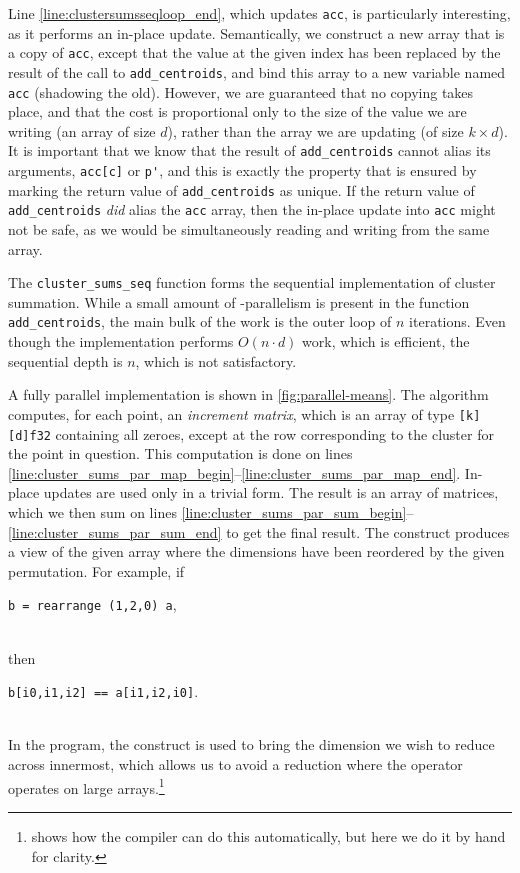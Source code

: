 Line \ref{line:clustersumsseqloop_end}, which updates \texttt{acc}, is
particularly interesting, as it performs an in-place update.
Semantically, we construct a new array that is a copy of \texttt{acc},
except that the value at the given index has been replaced by the
result of the call to \texttt{add\_centroids}, and bind this array to
a new variable named \texttt{acc} (shadowing the old).  However, we
are guaranteed that no copying takes place, and that the cost is
proportional only to the size of the value we are writing (an array of
size $d$), rather than the array we are updating (of size
$k\times{}d$).  It is important that we know that the result of
\lstinline{add_centroids} cannot alias its arguments,
\lstinline{acc[c]} or \lstinline{p'}, and this is exactly the property
that is ensured by marking the return value of
\lstinline{add_centroids} as unique.  If the return value of
\lstinline{add_centroids} \textit{did} alias the \lstinline{acc}
array, then the in-place update into \lstinline{acc} might not be
safe, as we would be simultaneously reading and writing from the same
array.

The \lstinline{cluster_sums_seq} function forms the sequential
implementation of cluster summation.  While a small amount of
-parallelism is present in the function
\lstinline{add_centroids}, the main bulk of the work is the outer loop
of $n$ iterations.  Even though the implementation performs
$O(n\cdot{}d)$ work, which is efficient, the sequential depth is $n$,
which is not satisfactory.

A fully parallel implementation is shown in \cref{fig:parallel-means}.
The algorithm computes, for each point, an \textit{increment matrix},
which is an array of type \lstinline{[k][d]f32} containing all zeroes,
except at the row corresponding to the cluster for the point in
question.  This computation is done on lines
\ref{line:cluster_sums_par_map_begin}--\ref{line:cluster_sums_par_map_end}.
In-place updates are used only in a trivial form.  The result is an
array of matrices, which we then sum on lines
\ref{line:cluster_sums_par_sum_begin}--\ref{line:cluster_sums_par_sum_end}
to get the final result.  The  construct produces a view
of the given
array where the dimensions have been reordered by the given permutation.  For example, if\\
\centerline{\lstinline{b = rearrange (1,2,0) a},}\\
then\\
\centerline{\lstinline{b[i0,i1,i2] == a[i1,i2,i0]}.}\\
In the program, the  construct is used to bring the
dimension we wish to reduce across innermost, which allows us to avoid
a reduction where the operator operates on large
arrays.\footnote{ shows how the compiler
  can do this automatically, but here we do it by hand for clarity.}

